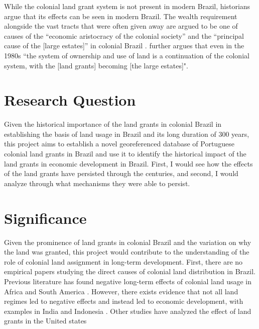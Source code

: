 \documentclass[11pt]{article}
\begin{document}
While the colonial land grant system is not present in modern Brazil, historians argue that its effects can be seen in modern Brazil.
The wealth requirement alongside the vast tracts that were often given away are argued to be one of causes of the ``economic aristocracy of the colonial society'' and the ``principal cause of the [large estates]'' in colonial Brazil \parencites[p.~36]{Lima2002-kd}[p.~48]{Da_Costa_Porto1979-dz}. 
\textcite[p.~18]{Andrade1980-md} further argues that even in the 1980s ``the system of ownership and use of land is a continuation of the colonial system, with the [land grants] becoming [the large estates]".

\section{Research Question}

Given the historical importance of the land grants in colonial Brazil in establishing the basis of land usage in Brazil and its long duration of 300 years, this project aims to establish a novel georeferenced database of Portuguese colonial land grants in Brazil and use it to identify the historical impact of the land grants in economic development in Brazil. First, I would see how the effects of the land grants have persisted through the centuries, and second, I would analyze through what mechanisms they were able to persist. 

\section{Significance}

Given the prominence of land grants in colonial Brazil and the variation on why the land was granted, this project would contribute to the understanding of the role of colonial land assignment in long-term development.  
First, there are no empirical papers studying the direct causes of colonial land distribution in Brazil. 
Previous literature has found negative long-term effects of colonial land usage in Africa and South America \parencites{Dell2010-qt}{Lowes2021-ww}. 
However, there exists evidence that not all land regimes led to negative effects and instead led to economic development, with examples in India and Indonesia \parencites{Banerjee2005-ki}{Dell2019-np}{Ratnoo2023-vw}.  
Other studies have analyzed the effect of land grants in the United states \parencites{Akee2014-uw}{Allen2019-kh}{Smith2023-ip}
\end{document}
